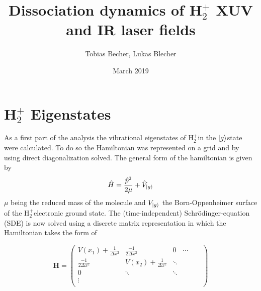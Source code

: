 \documentclass[12pt]{article}
\title{Dissociation dynamics of H$_2^+$ XUV and IR laser fields}
\author{Tobias Becher, Lukas Blecher}
\date{March 2019}
\newcommand{\hp}{H$_2^+$}
\newcommand{\gr}{$\ket{g}$}
\begin{document}
\maketitle
\begin{abstract}
    
\end{abstract}



\section{H$_2^+$ Eigenstates}
As a first part of the analysis the vibrational eigenstates of \hp in the 
\gr state were calculated. To do so the Hamiltonian was represented on a grid and by using direct diagonalization solved.
The general form of the hamiltonian is given by 
\begin{equation}\label{eqn:generalHamiltonian}
    \hat{H}=\frac{\hat{p}^2}{2\mu}+\hat{V}_{\ket{g}}
\end{equation}
$\mu$ being the reduced mass of the molecule and $V_{\ket{g}}$ the Born-Oppenheimer surface of the \hp electronic ground state.
The (time-independent) Schr\"odinger-equation (SDE) is now solved using a discrete matrix representation in which the Hamiltonian takes the form of

\begin{equation}\label{eqn:discresteHamiltonian}
    \mathbf H=\left({\begin{array}{cccccc}
   V(x_1)+\frac{1}{\Delta x^2} & \frac{-1}{2\Delta x^2} &0& \cdots & &\\
   \frac{-1}{2\Delta x^2} & V(x_2)+\frac{1}{\Delta x^2} & \ddots & & & \\
   0 &\ddots  &\ddots &&&\\
   \vdots&&&&&\\
  \end{array} } \right)
\end{equation}



\end{document}
